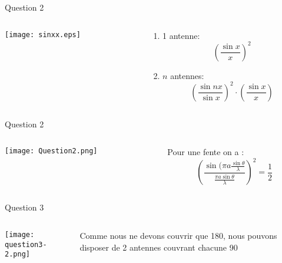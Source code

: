 \documentclass{beamer}
\begin{document}
\begin{frame}{Question 2}
	\begin{columns}
		\begin{column}{0.60\textwidth}
			\begin{center}
	    		\texttt{[image: sinxx.eps]}
        		\end{center}
        	\end{column}
        	\begin{column}{0.35\textwidth}
			\begin{center}
	    \begin{enumerate}
	    \item 1 antenne:$$ \left( \frac{\sin x}{x}\right)^2$$
	    \item $n$ antennes: $$ \left( \frac{\sin nx}{\sin x}\right)^2 \cdot \left( \frac{\sin x}{x}\right)$$
	    \end{enumerate}
	    
        	\end{center}
        	\end{column}
        	\end{columns}
\end{frame}
\begin{frame}{Question 2}
	\begin{columns}
		\begin{column}{0.40\textwidth}
			\begin{center}
	    		\texttt{[image: Question2.png]}
        		\end{center}
        	\end{column}
        	\begin{column}{0.40\textwidth}
			\begin{center}
	    Pour une fente on a :
	    $$\left( \frac{\sin (\pi a \frac{\sin \theta}{\lambda}}{\frac{\pi a \sin \theta}{\lambda}}\right)^2=\frac{1}{2}$$
	    
        	\end{center}
        	\end{column}
        	\end{columns}
\end{frame}
\begin{frame}{Question 3}
	\begin{columns}
		\begin{column}{0.40\textwidth}
			\begin{center}
	    		\texttt{[image: question3-2.png]}
        		\end{center}
        	\end{column}
        	\begin{column}{0.40\textwidth}
	    Comme nous ne devons couvrir que \unit{180}{\degree}, nous pouvons disposer de 2 antennes couvrant chacune \unit{90}{\degree}
	   
        	\end{column}
        	\end{columns}
\end{frame}
\end{document}
